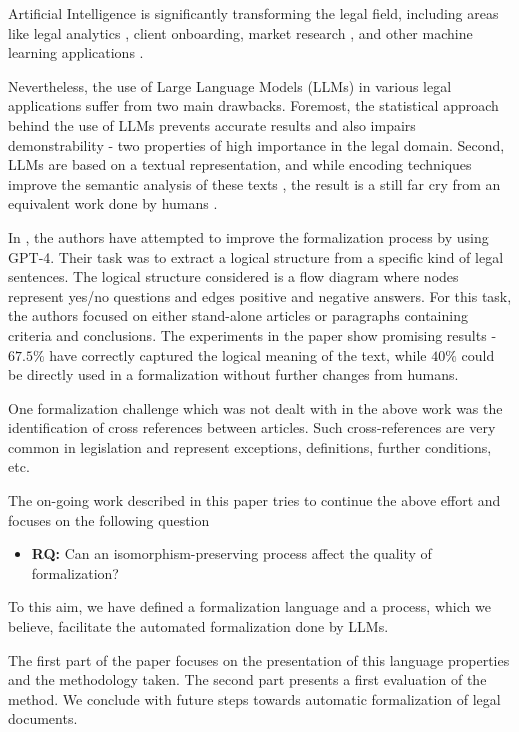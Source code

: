Artificial Intelligence is significantly transforming the legal field, including areas like legal analytics \cite{alschner2021ai}, client onboarding, market research \cite{martin2019marketing}, and other machine learning applications \cite{surden2021machine}.

Nevertheless, the use of Large Language Models (LLMs) in various legal applications suffer from two main drawbacks.
Foremost, the statistical approach behind the use of LLMs prevents accurate results and also impairs demonstrability \cite{cooper2022accountability} - two properties of high importance in the legal domain.
Second, LLMs are based on a textual representation, and while encoding techniques improve the semantic analysis of these texts \cite{vaswani2017attention},
the result is a still far cry from an equivalent work done by humans \cite{janatian2023text}.

In \cite{janatian2023text}, the authors have attempted to improve the formalization process by using GPT-4.
Their task was to extract a logical structure from a specific kind of legal sentences.
The logical structure considered is a flow diagram where nodes represent yes/no questions and edges positive and negative answers.
For this task, the authors focused on either stand-alone articles or paragraphs containing criteria and conclusions.
The experiments in the paper show promising results - $67.5\%$ have correctly captured the logical meaning of the text, while $40\%$
could be directly used in a formalization without further changes from humans.

One formalization challenge which was not dealt with in the above work was the identification of cross references between articles.
Such cross-references are very common in legislation and represent exceptions, definitions, further conditions, etc.

The on-going work described in this paper tries to continue the above effort and focuses on the following question

\begin{itemize}
  \item {\bf RQ:} Can an isomorphism-preserving process affect the quality of formalization?
\end{itemize}

To this aim, we have defined a formalization language and a process, which we believe, facilitate the automated formalization done by LLMs.

The first part of the paper focuses on the presentation of this language properties and the methodology taken. The second part presents a first evaluation of the method. We conclude with future steps towards automatic formalization of legal documents.
